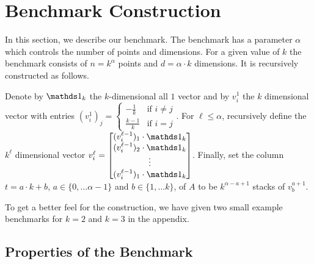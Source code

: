\section{Benchmark Construction}
\label{sec:benchmark}

In this section, we describe our benchmark. The benchmark has a parameter $\alpha$ which controls the number of points and dimensions.
For a given value of $k$ the benchmark consists of $n=k^\alpha$ points and $d=\alpha \cdot k$ dimensions.
It is recursively constructed as follows.

Denote by $\one_k$ 
the $k$-dimensional all $1$ vector and by $v_i^1$ the $k$ dimensional vector with entries $(v_i^1)_j = \begin{cases}-\frac{1}{k} & \text{if } i\neq j\\
\frac{k-1}{k} & \text{if } i= j\end{cases}$.
For $\ell\leq \alpha$, recursively define the $k^{\ell}$ dimensional vector $v_i^{\ell} = \begin{bmatrix}
(v_i^{\ell-1})_1 \cdot \one_k \\
(v_i^{\ell-1})_2 \cdot \one_k \\
\vdots \\
(v_i^{\ell-1})_1 \cdot \one_k
\end{bmatrix}$. Finally, set the column $t = a\cdot k + b$, $a\in \{0,\ldots \alpha-1\}$ and $b \in \{1,\ldots k\}$, of $A$ to be $k^{\alpha-a+1}$  stacks of $v_b^{a+1}$.


To get a better feel for the construction, we have given two small example benchmarks for $k=2$ and $k=3$ in the appendix.


\subsection{Properties of the Benchmark}

